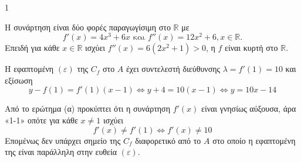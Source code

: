 \begin{ylh}{1}
    \item [Μαθηματικά Γ' Λυκείου - Ανάλυση]
\end{ylh}
\begin{alist}
    \item Η συνάρτηση είναι δύο φορές παραγωγίσιμη στο $\mathbb{R}$ με
    \[ f'(x)=4x^3+6x \text{ και } f''(x)=12x^2+6, x \in \mathbb{R}. \]
    Επειδή για κάθε $x \in \mathbb{R}$ ισχύει $f''(x)=6(2x^2+1)>0$, η $f$ είναι κυρτή στο $\mathbb{R}$.
    \item
    \begin{rlist}
        \item Η εφαπτομένη $(\varepsilon)$ της $C_f$ στο $A$ έχει συντελεστή διεύθυνσης $\lambda = f'(1) = 10$ και εξίσωση
        \[ y - f(1) = f'(1)(x-1) \Leftrightarrow y+4=10(x-1) \Leftrightarrow y=10x-14 \]
        \item Από το ερώτημα (α) προκύπτει ότι η συνάρτηση $f'(x)$ είναι γνησίως αύξουσα, άρα «1-1»
        οπότε για κάθε $x \neq 1$ ισχύει
        \[ f'(x) \neq f'(1) \Leftrightarrow f'(x) \neq 10 \]
        Επομένως δεν υπάρχει σημείο της $C_f$ διαφορετικό από το $A$ στο οποίο η εφαπτομένη της
        είναι παράλληλη στην ευθεία $(\varepsilon)$.
    \end{rlist}
\end{alist}